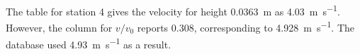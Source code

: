 The table for station 4 gives the velocity for height \SI{0.0363}{\m} as
\SI{4.03}{\m\per\s}.  However, the column for $v/v_0$ reports 0.308,
corresponding to \SI{4.928}{\m\per\s}.  The database used \SI{4.93}{\m\per\s}
as a result.
